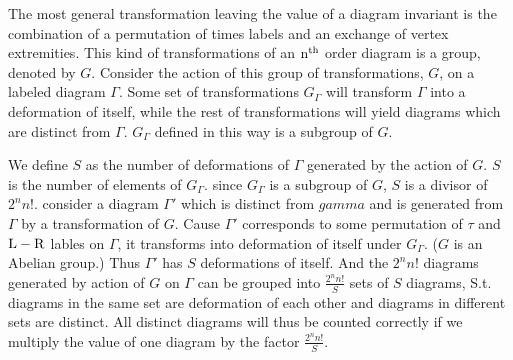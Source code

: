 \documentclass[12pt]{article}
\begin{document}
The most general transformation leaving the value of a diagram invariant is the 
combination of a permutation of times labels and an exchange of vertex extremities. 
This kind of transformations of an $\rm n^{th}$ order diagram is a group, denoted by 
$G$. Consider the action of this group of transformations, $G$, on a labeled diagram 
$\Gamma$. Some set of transformations $G_{\Gamma}$ will transform $\Gamma$ into a 
deformation of itself, while the rest of transformations will yield diagrams which 
are distinct from $\Gamma$. $G_{\Gamma}$ defined in this way is a subgroup of $G$.

We define $S$ as the number of deformations of $\Gamma$ generated by the action of 
$G$. $S$ is the number of elements of $G_\Gamma$. since $G_\Gamma$ is a subgroup 
of $G$, $S$ is a divisor of $2^nn!$. consider a diagram $\Gamma'$ which is distinct 
from $gamma$ and is generated from $\Gamma$ by a transformation of $G$. Cause 
$\Gamma'$ corresponds to some permutation of $\tau$ and $\rm L-R$ lables on $\Gamma$, 
it transforms into deformation of itself under $G_\Gamma$. ($G$ is an Abelian group.) 
Thus $\Gamma'$ has $S$ deformations of itself. And the $2^nn!$ diagrams generated 
by action of $G$ on $\Gamma$ can be grouped into $\frac{2^nn!}{S}$ sets of $S$ 
diagrams, S.t. diagrams in the same set are deformation of each other and diagrams 
in different sets are distinct. All distinct diagrams will thus be counted correctly 
if we multiply the value of one diagram by the factor $\frac{2^nn!}{S}$.
\end{document}
